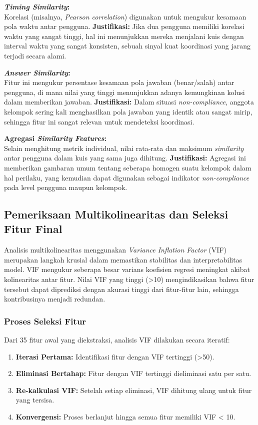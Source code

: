 \textbf{\textit{Timing Similarity}:} \\
Korelasi (misalnya, \textit{Pearson correlation}) digunakan untuk mengukur kesamaan pola waktu antar pengguna.
\textbf{Justifikasi:} Jika dua pengguna memiliki korelasi waktu yang sangat tinggi, hal ini menunjukkan mereka menjalani kuis dengan interval waktu yang sangat konsisten, sebuah sinyal kuat koordinasi yang jarang terjadi secara alami.

\textbf{\textit{Answer Similarity}:} \\
Fitur ini mengukur persentase kesamaan pola jawaban (benar/salah) antar pengguna, di mana nilai yang tinggi menunjukkan adanya kemungkinan kolusi dalam memberikan jawaban.
\textbf{Justifikasi:} Dalam situasi \textit{non-compliance}, anggota kelompok sering kali menghasilkan pola jawaban yang identik atau sangat mirip, sehingga fitur ini sangat relevan untuk mendeteksi koordinasi.

\textbf{Agregasi \textit{Similarity Features}:} \\
Selain menghitung metrik individual, nilai rata-rata dan maksimum \textit{similarity} antar pengguna dalam kuis yang sama juga dihitung.
\textbf{Justifikasi:} Agregasi ini memberikan gambaran umum tentang seberapa homogen suatu kelompok dalam hal perilaku, yang kemudian dapat digunakan sebagai indikator \textit{non-compliance} pada level pengguna maupun kelompok.

\subsection{Pemeriksaan Multikolinearitas dan Seleksi Fitur Final}
\label{sec:pemeriksaanMultikolinearitas}

Analisis multikolinearitas menggunakan \textit{Variance Inflation Factor} (VIF) merupakan langkah krusial dalam memastikan stabilitas dan interpretabilitas model. VIF mengukur seberapa besar varians koefisien regresi meningkat akibat kolinearitas antar fitur. Nilai VIF yang tinggi (>10) mengindikasikan bahwa fitur tersebut dapat diprediksi dengan akurasi tinggi dari fitur-fitur lain, sehingga kontribusinya menjadi redundan.

\subsubsection{Proses Seleksi Fitur}
Dari 35 fitur awal yang diekstraksi, analisis VIF dilakukan secara iteratif:
\begin{enumerate}
    \item \textbf{Iterasi Pertama:} Identifikasi fitur dengan VIF tertinggi (>50).
    \item \textbf{Eliminasi Bertahap:} Fitur dengan VIF tertinggi dieliminasi satu per satu.
    \item \textbf{Re-kalkulasi VIF:} Setelah setiap eliminasi, VIF dihitung ulang untuk fitur yang tersisa.
    \item \textbf{Konvergensi:} Proses berlanjut hingga semua fitur memiliki VIF < 10.
\end{enumerate}

